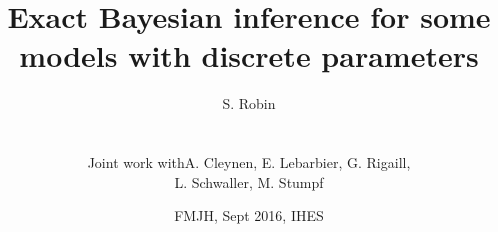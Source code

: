 \documentclass[10pt]{beamer}
\newcommand{\fignet}{/home/robin/Bureau/RECHERCHE/RESEAUX/EXPOSES/FIGURES}
\begin{document}

\title[Exact inference with discrete parameters]{Exact Bayesian inference for some models with discrete parameters}

\author[S. Robin]{S. Robin \\ ~\\
  \begin{tabular}{ll}
    Joint work with & A. Cleynen, E. Lebarbier, G. Rigaill, \\
    & L. Schwaller, M. Stumpf
  \end{tabular}
  }


\date[FMJH '16]{FMJH, Sept 2016, IHES}

\maketitle

\end{document}

